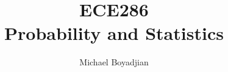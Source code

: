 \documentclass[11pt]{article}
\begin{document}
\title{ECE286 \\ Probability and Statistics}
\author{Michael Boyadjian}
\maketitle
\pagebreak

\tableofcontents

\pagebreak

\bigskip
\bigskip
\bigskip
\end{document}
